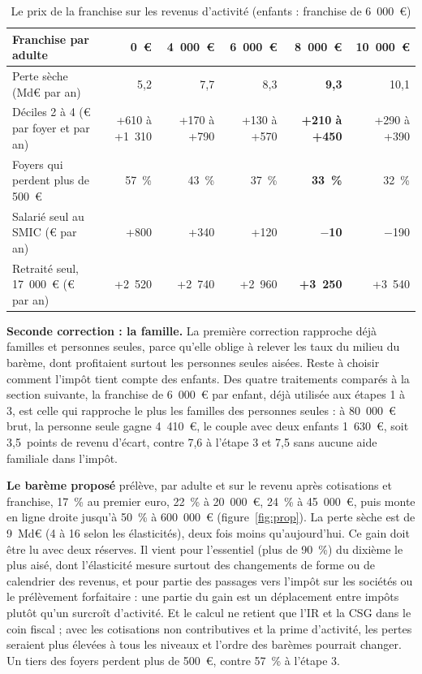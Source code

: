 \documentclass[11pt,a4paper]{article}
\begin{document}
\begin{table}[!htbp]\centering\scriptsize\setlength{\tabcolsep}{3pt}
\caption{Le prix de la franchise sur les revenus d'activité (enfants : franchise de 6~000~€)}\label{tab:franchise}
\begin{tabular}{@{}lrrrrr@{}}
\toprule
Franchise par adulte & 0~€ & 4~000~€ & 6~000~€ & \textbf{8~000~€} & 10~000~€ \\
\midrule
Perte sèche (Md€ par an) & 5,2 & 7,7 & 8,3 & \textbf{9,3} & 10,1 \\
Déciles 2 à 4 (€ par foyer et par an) & +610 à +1~310 & +170 à +790 & +130 à +570 & \textbf{+210 à +450} & +290 à +390 \\
Foyers qui perdent plus de 500~€ & 57~\% & 43~\% & 37~\% & \textbf{33~\%} & 32~\% \\
Salarié seul au SMIC (€ par an) & +800 & +340 & +120 & \textbf{$-$10} & $-$190 \\
Retraité seul, 17~000~€ (€ par an) & +2~520 & +2~740 & +2~960 & \textbf{+3~250} & +3~540 \\
\bottomrule
\end{tabular}
\end{table}

\textbf{Seconde correction : la famille.} La première correction rapproche déjà familles et personnes
seules, parce qu'elle oblige à relever les taux du milieu du barème, dont profitaient surtout les personnes
seules aisées. Reste à choisir comment l'impôt tient compte des enfants. Des quatre traitements comparés à la
section suivante, la franchise de 6~000~€ par enfant, déjà utilisée aux étapes 1 à 3, est celle qui
rapproche le plus les familles des personnes seules : à 80~000~€ brut, la personne seule gagne 4~410~€, le
couple avec deux enfants 1~630~€, soit 3,5~points de revenu d'écart, contre 7,6 à l'étape 3 et 7,5 sans aucune
aide familiale dans l'impôt.

\textbf{Le barème proposé} prélève, par adulte et sur le revenu après cotisations et franchise, 17~\% au
premier euro, 22~\% à 20~000~€, 24~\% à 45~000~€, puis monte en ligne droite jusqu'à 50~\% à 600~000~€
(figure~\ref{fig:prop}). La perte sèche est de 9~Md€ (4 à 16 selon les élasticités), deux fois moins
qu'aujourd'hui. Ce gain doit être lu avec deux réserves. Il vient pour l'essentiel (plus de 90~\%) du
dixième le plus aisé, dont l'élasticité mesure surtout des changements de forme ou de calendrier des revenus,
et pour partie des passages vers l'impôt sur les sociétés ou le prélèvement forfaitaire : une partie du gain
est un déplacement entre impôts plutôt qu'un surcroît d'activité. Et le calcul ne retient que l'IR et la CSG
dans le coin fiscal ; avec les cotisations non contributives et la prime d'activité, les pertes seraient plus
élevées à tous les niveaux et l'ordre des barèmes pourrait changer. Un tiers des foyers perdent plus de 500~€, contre 57~\% à l'étape 3.
\end{document}
